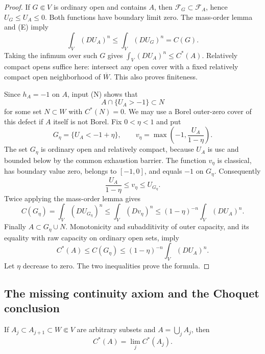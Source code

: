 \begin{proof}
If $G\Subset V$ is ordinary open and contains $A$, then
$\mathcal F_G\subset\mathcal F_A$, hence $U_G\leq U_A\leq0$.
Both functions have boundary limit zero. The mass-order lemma and
\textup{(E)} imply
\[
 \int_V(DU_A)^n\leq\int_V(DU_G)^n=C(G).
\]
Taking the infimum over such $G$ gives
$\int_V(DU_A)^n\leq C^*(A)$. Relatively compact opens suffice here:
intersect any open cover with a fixed relatively compact open
neighborhood of $\overline W$. This also proves finiteness.

Since $h_A=-1$ on $A$, input \textup{(N)} shows that
\[
 A\cap\{U_A>-1\}\subset N
\]
for some set $N\subset W$ with $C^*(N)=0$. We may use a Borel
outer-zero cover of this defect if $A$ itself is not Borel.
Fix $0<\eta<1$ and put
\[
 G_\eta=\{U_A<-1+\eta\},\qquad
 v_\eta=\max\left(-1,\frac{U_A}{1-\eta}\right).
\]
The set $G_\eta$ is ordinary open and relatively compact, because
$U_A$ is usc and bounded below by the common exhaustion barrier.
The function $v_\eta$ is classical, has boundary value zero,
belongs to $[-1,0]$, and equals $-1$ on $G_\eta$. Consequently
\[
 \frac{U_A}{1-\eta}\leq v_\eta\leq U_{G_\eta}.
\]
Twice applying the mass-order lemma gives
\[
 C(G_\eta)=\int_V(DU_{G_\eta})^n
 \leq\int_V(Dv_\eta)^n
 \leq(1-\eta)^{-n}\int_V(DU_A)^n.
\]
Finally $A\subset G_\eta\cup N$. Monotonicity and subadditivity
of outer capacity, and its equality with raw capacity on ordinary
open sets, imply
\[
 C^*(A)\leq C(G_\eta)
 \leq(1-\eta)^{-n}\int_V(DU_A)^n.
\]
Let $\eta$ decrease to zero. The two inequalities prove the formula.
\end{proof}

\subsection{The missing continuity axiom and the Choquet conclusion}

\begin{theorem}
\label{thm:r2-outer-capacity-increasing-sets}
If $A_j\subset A_{j+1}\subset W\Subset V$ are arbitrary subsets
and $A=\bigcup_jA_j$, then
\[
 C^*(A)=\lim_j C^*(A_j).
\]
\end{theorem}

